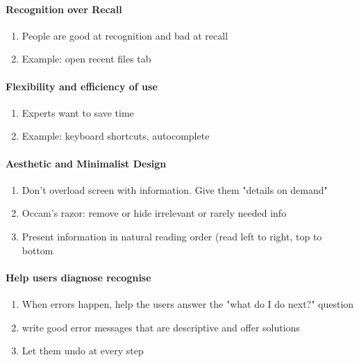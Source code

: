 \paragraph{Recognition over Recall}
\begin{enumerate}
    \item People are good at recognition and bad at recall
    \item Example: open recent files tab 
\end{enumerate}

\paragraph{Flexibility and efficiency of use}
\begin{enumerate}
    \item Experts want to save time
    \item Example: keyboard shortcuts, autocomplete 
\end{enumerate}

\paragraph{Aesthetic and Minimalist Design}
\begin{enumerate}
    \item Don't overload screen with information. Give them "details on demand"
    \item Occam's razor: remove or hide irrelevant or rarely needed info
    \item Present information in natural reading order (read left to right, top to bottom
\end{enumerate}

\paragraph{Help users diagnose recognise }
\begin{enumerate}
    \item When errors happen, help the users answer the "what do I do next?" question
    \item write good error messages that are descriptive and offer solutions
    \item Let them undo at every step  
\end{enumerate}


